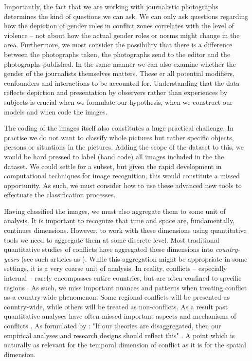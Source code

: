 \documentclass[a4paper]{article}
\begin{document}
Importantly, the fact that we are working with journalistic photographs determines the kind of questions we can ask. We can only ask questions regarding how the depiction of gender roles in conflict zones correlates with the level of violence -- not about how the actual gender roles or norms might change in the area. Furthermore, we most consider the possibility that there is a difference between the photographs taken, the photographs send to the editor and the photographs published. In the same manner we can also examine whether the gender of the journalists themselves matters. These er all potential modifiers, confounders and interactions to be accounted for. Understanding that the data reflects depiction and presentation by observers rather than experiences by subjects is crucial when we formulate our hypothesis, when we construct our models and when code the images.\par

The coding of the images itself also constitutes a huge practical challenge. In practise we do not want to classify whole pictures but rather specific objects, persons or situations in the pictures. Adding the scope of the dataset to this, we would be hard pressed to label (hand code) all images included in the the dataset. We could settle for a subset, but given the rapid development in computational techniques for image recognition, this would constitute a missed opportunity. As such, we must consider how to use these advanced new tools to effectuate the classification processes.\par 
Having classified the images, we must also aggregate them to some unit of analysis. It is important to recognize that time and space are, fundamentally, continues dimensions. However, to work with these dimensions using quantitative tools we need to aggregate them at some discrete level. Most traditional quantitative studies of conflicts have aggregated these dimensions into \emph{country-years} (see such articles as \cite{Collier_Hoeffler_1998, Fearon_Laitin_2003, Collier_Hoeffler_2004, Fearon_2004, Ross_2004, Fearon_2005, Hegre_Sambanis_2006, Goldstone_2010}). While this aggregation might be appropriate in some settings, it is a very coarse unit of analysis. In reality, conflicts -- especially internal -- rarely encompasses entire countries, but are often confined to specific regions \citep[487]{Cederman_Gleditsch_2009}. As such, we miss important nuances and patterns when treating conflict as a country-wide phenomenon. Some regional conflicts will be presented as country-wide, while others will be treated as non-conflicts. As a result past quantitative analyses have often missed important aspects and mechanisms of conflicts \citep{Cederman_Gleditsch_2009, Cederman_Gleditsch_Buhaug_2013}. As formulated by \cite{Cederman_Gleditsch_2009}: "If our theories are disaggregated, then our empirical analyses and research designs should reflect this" \citep[490]{Cederman_Gleditsch_2009}. A point which is naturally as relevant for the temporal dimension of conflict as it is for the spatial dimension.\par 
\end{document}
